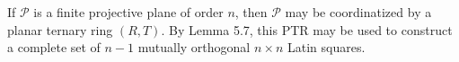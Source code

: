 If $\mathcal{P}$ is a finite projective plane of order $n$, then $\mathcal{P}$ may be coordinatized by a planar ternary ring $(R, T)$. By Lemma 5.7, this PTR may be used to construct a complete set of $n-1$ mutually orthogonal $n \times n$ Latin squares.
